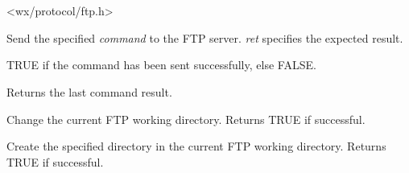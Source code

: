 \section{}\label{wxftp}




<wx/protocol/ftp.h>







Send the specified {\it command} to the FTP server. {\it ret} specifies
the expected result.


TRUE if the command has been sent successfully, else FALSE.




Returns the last command result.




Change the current FTP working directory.
Returns TRUE if successful.



Create the specified directory in the current FTP working directory.
Returns TRUE if successful.



